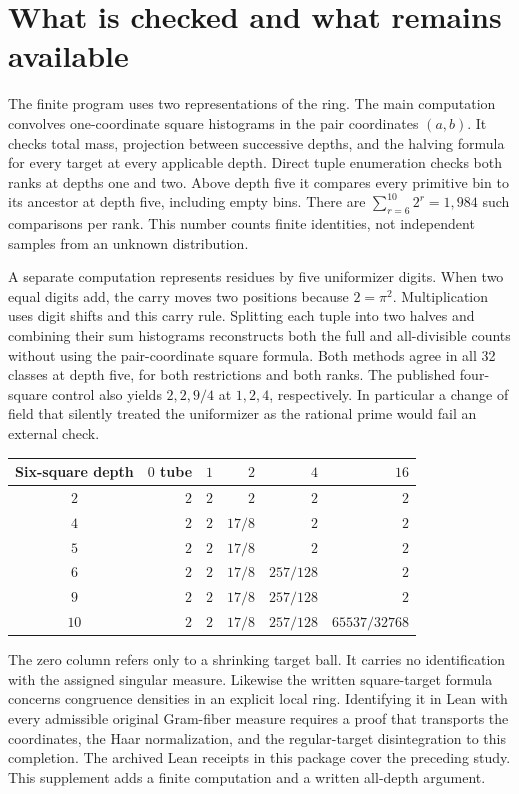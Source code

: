 \documentclass[12pt,letterpaper]{article}
\begin{document}
\section{What is checked and what remains available}\label{sec:scoutchecks}
The finite program uses two representations of the ring. The main computation convolves one-coordinate square histograms in the pair coordinates $(a,b)$. It checks total mass, projection between successive depths, and the halving formula for every target at every applicable depth. Direct tuple enumeration checks both ranks at depths one and two. Above depth five it compares every primitive bin to its ancestor at depth five, including empty bins. There are $\sum_{r=6}^{10}2^r=1{,}984$ such comparisons per rank. This number counts finite identities, not independent samples from an unknown distribution.

A separate computation represents residues by five uniformizer digits. When two equal digits add, the carry moves two positions because $2=\pi^2$. Multiplication uses digit shifts and this carry rule. Splitting each tuple into two halves and combining their sum histograms reconstructs both the full and all-divisible counts without using the pair-coordinate square formula. Both methods agree in all 32 classes at depth five, for both restrictions and both ranks. The published four-square control also yields $2,2,9/4$ at $1,2,4$, respectively. In particular a change of field that silently treated the uniformizer as the rational prime would fail an external check.

\begin{center}\small
\begin{tabular}{c|rrrrr}\toprule
Six-square depth & $0$ tube & $1$ & $2$ & $4$ & $16$\\\midrule
$2$ & $2$ & $2$ & $2$ & $2$ & $2$\\
$4$ & $2$ & $2$ & $17/8$ & $2$ & $2$\\
$5$ & $2$ & $2$ & $17/8$ & $2$ & $2$\\
$6$ & $2$ & $2$ & $17/8$ & $257/128$ & $2$\\
$9$ & $2$ & $2$ & $17/8$ & $257/128$ & $2$\\
$10$ & $2$ & $2$ & $17/8$ & $257/128$ & $65537/32768$\\\bottomrule
\end{tabular}
\end{center}
The zero column refers only to a shrinking target ball. It carries no identification with the assigned singular measure. Likewise the written square-target formula concerns congruence densities in an explicit local ring. Identifying it in Lean with every admissible original Gram-fiber measure requires a proof that transports the coordinates, the Haar normalization, and the regular-target disintegration to this completion. The archived Lean receipts in this package cover the preceding study. This supplement adds a finite computation and a written all-depth argument.
\end{document}
